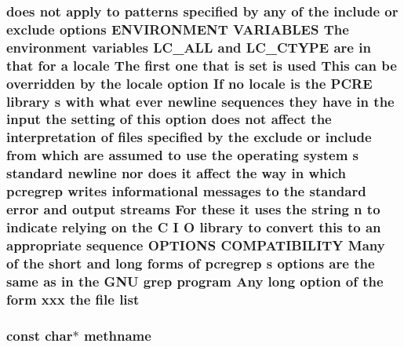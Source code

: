 \subsubsection[{\texorpdfstring{list}{list}}]{ does {\bf not} apply {\bf to} {\bf patterns} {\bf specified} by {\bf any} {\bf of} the {\bf include} {\bf or} {\bf exclude} {\bf options} E\+N\+V\+I\+R\+O\+N\+M\+E\+NT V\+A\+R\+I\+A\+B\+L\+ES The {\bf environment} {\bf variables} L\+C\+\_\+\+A\+LL and L\+C\+\_\+\+C\+T\+Y\+PE {\bf are} {\bf in} that for {\bf a} {\bf locale} The {\bf first} one that {\bf is} {\bf set} {\bf is} {\bf used} This {\bf can} {\bf be} overridden by the {\bf locale} {\bf option} If no {\bf locale} {\bf is} the {\bf P\+C\+RE} {\bf library} {\bf s} {\bf with} {\bf what} {\bf ever} {\bf newline} sequences they have {\bf in} the {\bf input} the {\bf setting} {\bf of} {\bf this} {\bf option} does {\bf not} affect the interpretation {\bf of} {\bf files} {\bf specified} by the {\bf exclude} {\bf or} {\bf include} {\bf from} {\bf which} {\bf are} assumed {\bf to} use the operating {\bf system} {\bf s} standard {\bf newline} nor does {\bf it} affect the {\bf way} {\bf in} {\bf which} pcregrep writes informational messages {\bf to} the standard {\bf error} and {\bf output} streams For these {\bf it} uses the {\bf string} {\bf n} {\bf to} indicate relying {\bf on} the {\bf C} {\bf I} O {\bf library} {\bf to} convert {\bf this} {\bf to} an appropriate {\bf sequence} {\bf O\+P\+T\+I\+O\+NS} C\+O\+M\+P\+A\+T\+I\+B\+I\+L\+I\+TY Many {\bf of} the short and long forms {\bf of} pcregrep {\bf s} {\bf options} {\bf are} the same {\bf as} {\bf in} the G\+NU {\bf grep} {\bf program} Any long {\bf option} {\bf of} the form {\bf xxx} the {\bf file} list}\hypertarget{group__APACHE__CORE__PROTO_gaeb6b944e4524f915483b5696b7f2f424}{}\label{group__APACHE__CORE__PROTO_gaeb6b944e4524f915483b5696b7f2f424}
\subsubsection[{\texorpdfstring{methname}{methname}}]{\setlength{\rightskip}{0pt plus 5cm}const char$\ast$ methname}\hypertarget{group__APACHE__CORE__PROTO_ga881b3e130b3a53164706c3e1e76cfe7b}{}\label{group__APACHE__CORE__PROTO_ga881b3e130b3a53164706c3e1e76cfe7b}
